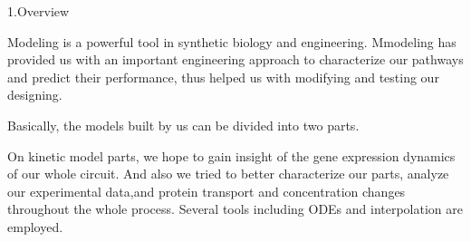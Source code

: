 \documentclass[UTF8]{ctexart}
\begin{document}
	\begin{center}
		{\Large 1.Overview} 
	\end{center}
   Modeling is a powerful tool in synthetic biology and engineering. Mmodeling has provided us with an important engineering approach to characterize our pathways and predict their performance, thus helped us with modifying and testing our designing.
	
	Basically, the models built by us can be divided into two parts.
	
	On kinetic model parts, we hope to gain insight of the gene expression dynamics of our whole circuit. And also we tried to better characterize our parts, analyze our experimental data,and protein transport and concentration changes throughout the whole process. Several tools including ODEs and interpolation are employed.
\end{document}
